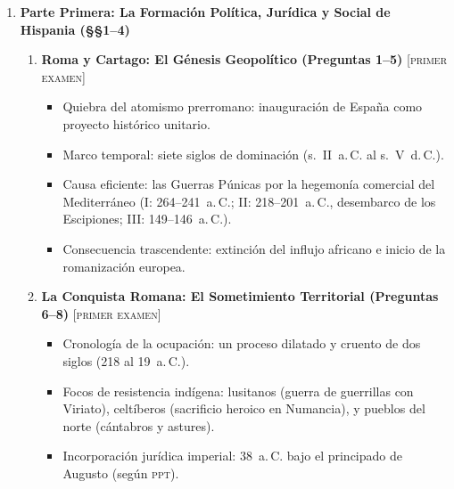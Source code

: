 \documentclass[11pt,letterpaper]{article}
\begin{document}
\begin{enumerate}[label=\textbf{\Roman*.}, leftmargin=1.5em, itemsep=0.5em]
  \item \textbf{Parte Primera: La Formación Política, Jurídica y Social de Hispania (§§1--4)}
  \begin{enumerate}[label=\textbf{\Alph*.}, leftmargin=1.4em, itemsep=0.35em]
    \item \textbf{Roma y Cartago: El Génesis Geopolítico (Preguntas 1--5)} \hfill {\footnotesize\color{goodingCrimson}\textsc{[primer examen]}}
    \begin{itemize}[leftmargin=1.2em, itemsep=0.15em]
      \item Quiebra del atomismo prerromano: inauguración de España como proyecto histórico unitario.
      \item Marco temporal: siete siglos de dominación (s.~II~a.\,C. al s.~V~d.\,C.).
      \item Causa eficiente: las Guerras Púnicas por la hegemonía comercial del Mediterráneo (I: 264--241~a.\,C.; II: 218--201~a.\,C., desembarco de los Escipiones; III: 149--146~a.\,C.).
      \item Consecuencia trascendente: extinción del influjo africano e inicio de la romanización europea.
    \end{itemize}

    \item \textbf{La Conquista Romana: El Sometimiento Territorial (Preguntas 6--8)} \hfill {\footnotesize\color{goodingCrimson}\textsc{[primer examen]}}
    \begin{itemize}[leftmargin=1.2em, itemsep=0.15em]
      \item Cronología de la ocupación: un proceso dilatado y cruento de dos siglos (218 al 19~a.\,C.).
      \item Focos de resistencia indígena: lusitanos (guerra de guerrillas con Viriato), celtíberos (sacrificio heroico en Numancia), y pueblos del norte (cántabros y astures).
      \item Incorporación jurídica imperial: 38~a.\,C. bajo el principado de Augusto (según \textsc{ppt}).
    \end{itemize}


\end{enumerate}
\end{enumerate}
\end{document}
